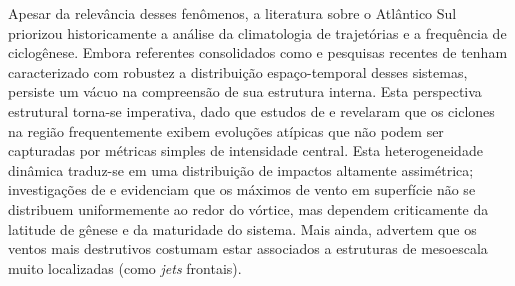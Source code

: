Apesar da relevância desses fenômenos, a literatura sobre o Atlântico Sul priorizou historicamente a análise da climatologia de trajetórias e a frequência de ciclogênese. Embora referentes consolidados como \citet{gramcianinov2020analysis} e pesquisas recentes de \citet{padilhareinke2026characterization} tenham caracterizado com robustez a distribuição espaço-temporal desses sistemas, persiste um vácuo na compreensão de sua estrutura interna.
Esta perspectiva estrutural torna-se imperativa, dado que estudos de \citet{gozzo2013air} e \citet{reboita2022from} revelaram que os ciclones na região frequentemente exibem evoluções atípicas que não podem ser capturadas por métricas simples de intensidade central.
Esta heterogeneidade dinâmica traduz-se em uma distribuição de impactos altamente assimétrica; investigações de \citet{bitencourt2010relating} e \citet{cardoso2022synoptic} evidenciam que os máximos de vento em superfície não se distribuem uniformemente ao redor do vórtice, mas dependem criticamente da latitude de gênese e da maturidade do sistema.
Mais ainda, \citet{eisenstein2023identification} advertem que os ventos mais destrutivos costumam estar associados a estruturas de mesoescala muito localizadas (como \textit{jets} frontais).
